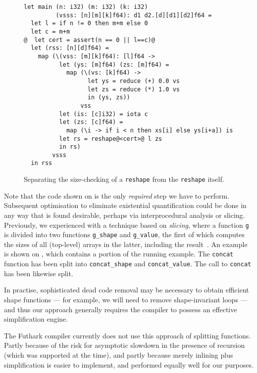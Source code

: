 \begin{figure}
\begin{lstlisting}[xleftmargin=0pt]
let main (n: i32) (m: i32) (k: i32)
         (vsss: [n][m][k]f64): d1 d2.[d][d1][d2]f64 =
  let l = if n != 0 then m+m else 0
  let c = m+m
@  let cert = assert(n == 0 || l==c)@
  let (rss: [n][d]f64) =
    map (\(vss: [m][k]f64): [l]f64 ->
          let (ys: [m]f64) (zs: [m]f64) =
            map (\(vs: [k]f64) ->
                  let ys = reduce (+) 0.0 vs
                  let zs = reduce (*) 1.0 vs
                  in (ys, zs))
                vss
          let (is: [c]i32) = iota c
          let (zs: [c]f64) =
            map (\i -> if i < n then xs[i] else ys[i+a]) is
          let rs = reshape@<cert>@ l zs
          in rs)
        vsss
  in rss
\end{lstlisting}

  \caption{Separating the size-checking of a \lstinline{reshape} from
    the \lstinline{reshape} itself.}
\label{fig:SimplifyFShapeCert}
\end{figure}

Note that the code shown on  is the only
\textit{required} step we have to perform.  Subsequent optimisation to
eliminate existential quantification could be done in any way that is
found desirable, perhaps via interprocedural analysis or slicing.
Previously, we experienced with a technique based on \textit{slicing},
where a function \lstinline{g} is divided into two functions
\lstinline{g_shape} and \lstinline{g_value}, the first of which
computes the sizes of all (top-level) arrays in the latter, including
the result~\cite{henriksen2014size}.  An example is shown on
, which contains a portion of the running
example.  The \lstinline{concat} function has been split into
\lstinline{concat_shape} and \lstinline{concat_value}. The call to
\lstinline{concat} has been likewise split.

In practise, sophisticated dead code removal may be necessary to
obtain efficient shape functions --- for example, we will need to
remove shape-invariant loops --- and thus our approach generally
requires the compiler to possess an effective simplification engine.

The Futhark compiler currently does not use this approach of splitting
functions.  Partly because of the risk for asymptotic slowdown in the
presence of recursion (which was supported at the time), and partly
because merely inlining plus simplification is easier to implement,
and performed equally well for our purposes.

